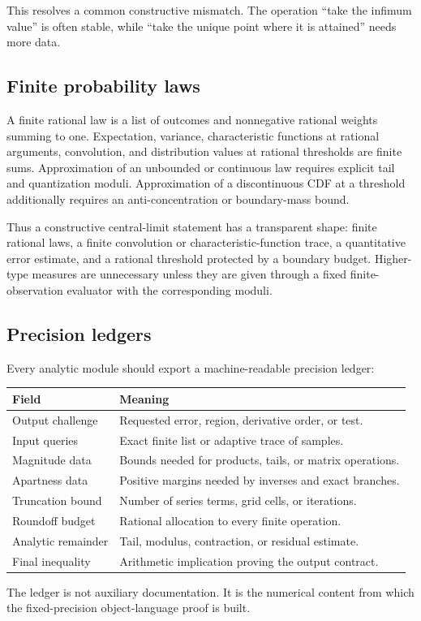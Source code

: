 This resolves a common constructive mismatch.  The operation
``take the infimum value'' is often stable, while ``take the unique point where
it is attained'' needs more data.

\subsection{Finite probability laws}

A finite rational law is a list of outcomes and nonnegative rational weights
summing to one.  Expectation, variance, characteristic functions at rational
arguments, convolution, and distribution values at rational thresholds are
finite sums.  Approximation of an unbounded or continuous law requires
explicit tail and quantization moduli.  Approximation of a discontinuous CDF
at a threshold additionally requires an anti-concentration or boundary-mass
bound.

Thus a constructive central-limit statement has a transparent shape:
finite rational laws, a finite convolution or characteristic-function trace,
a quantitative error estimate, and a rational threshold protected by a
boundary budget.  Higher-type measures are unnecessary unless they are given
through a fixed finite-observation evaluator with the corresponding moduli.

\subsection{Precision ledgers}

Every analytic module should export a machine-readable precision ledger:

\begin{longtable}{@{}p{}p{}@{}}
\toprule
Field & Meaning\\
\midrule
\endhead
Output challenge & Requested error, region, derivative order, or test.\\
Input queries & Exact finite list or adaptive trace of samples.\\
Magnitude data & Bounds needed for products, tails, or matrix operations.\\
Apartness data & Positive margins needed by inverses and exact branches.\\
Truncation bound & Number of series terms, grid cells, or iterations.\\
Roundoff budget & Rational allocation to every finite operation.\\
Analytic remainder & Tail, modulus, contraction, or residual estimate.\\
Final inequality & Arithmetic implication proving the output contract.\\
\bottomrule
\end{longtable}

The ledger is not auxiliary documentation.  It is the numerical content from
which the fixed-precision object-language proof is built.
